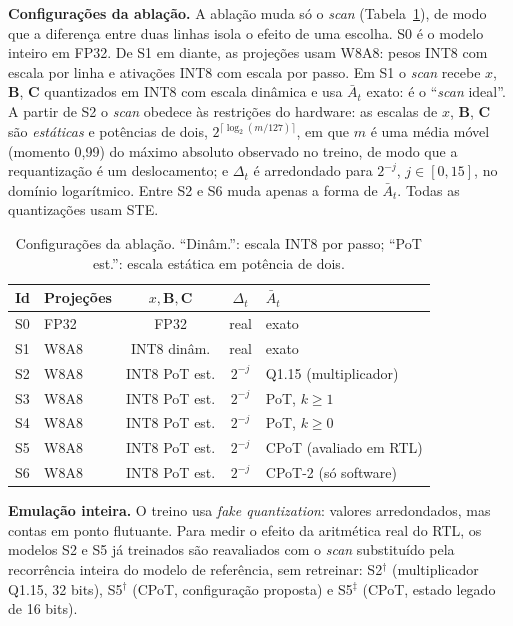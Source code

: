 \documentclass[12pt]{article}
\begin{document}
\textbf{Configurações da ablação.} A ablação muda só o \emph{scan} (Tabela~\ref{tab:configs}), de modo que a diferença entre duas linhas isola o efeito de uma escolha. S0 é o modelo inteiro em FP32. De S1 em diante, as projeções usam W8A8: pesos INT8 com escala por linha e ativações INT8 com escala por passo. Em S1 o \emph{scan} recebe $x$, $\mathbf{B}$, $\mathbf{C}$ quantizados em INT8 com escala dinâmica e usa $\bar{A}_t$ exato: é o ``\emph{scan} ideal''. A partir de S2 o \emph{scan} obedece às restrições do hardware: as escalas de $x$, $\mathbf{B}$, $\mathbf{C}$ são \emph{estáticas} e potências de dois, $2^{\lceil \log_2(m/127) \rceil}$, em que $m$ é uma média móvel (momento 0,99) do máximo absoluto observado no treino, de modo que a requantização é um deslocamento; e $\Delta_t$ é arredondado para $2^{-j}$, $j \in [0, 15]$, no domínio logarítmico. Entre S2 e S6 muda apenas a forma de $\bar{A}_t$. Todas as quantizações usam STE.

\begin{table}[htb]
\centering
\caption{Configurações da ablação. ``Dinâm.'': escala INT8 por passo; ``PoT est.'': escala estática em potência de dois.}
\label{tab:configs}
\footnotesize
\begin{tabular}{llccl}
\toprule
\textbf{Id} & \textbf{Projeções} & \textbf{$x, \mathbf{B}, \mathbf{C}$} & \textbf{$\Delta_t$} & \textbf{$\bar{A}_t$} \\
\midrule
S0 & FP32 & FP32 & real & exato \\
S1 & W8A8 & INT8 dinâm. & real & exato \\
S2 & W8A8 & INT8 PoT est. & $2^{-j}$ & Q1.15 (multiplicador) \\
S3 & W8A8 & INT8 PoT est. & $2^{-j}$ & PoT, $k\geq1$ \\
S4 & W8A8 & INT8 PoT est. & $2^{-j}$ & PoT, $k\geq0$ \\
S5 & W8A8 & INT8 PoT est. & $2^{-j}$ & CPoT (avaliado em RTL) \\
S6 & W8A8 & INT8 PoT est. & $2^{-j}$ & CPoT-2 (só software) \\
\bottomrule
\end{tabular}
\end{table}

\textbf{Emulação inteira.} O treino usa \emph{fake quantization}: valores arredondados, mas contas em ponto flutuante. Para medir o efeito da aritmética real do RTL, os modelos S2 e S5 já treinados são reavaliados com o \emph{scan} substituído pela recorrência inteira do modelo de referência, sem retreinar: S2$^\dagger$ (multiplicador Q1.15, 32 bits), S5$^\dagger$ (CPoT, configuração proposta) e S5$^\ddagger$ (CPoT, estado legado de 16 bits).
\end{document}
